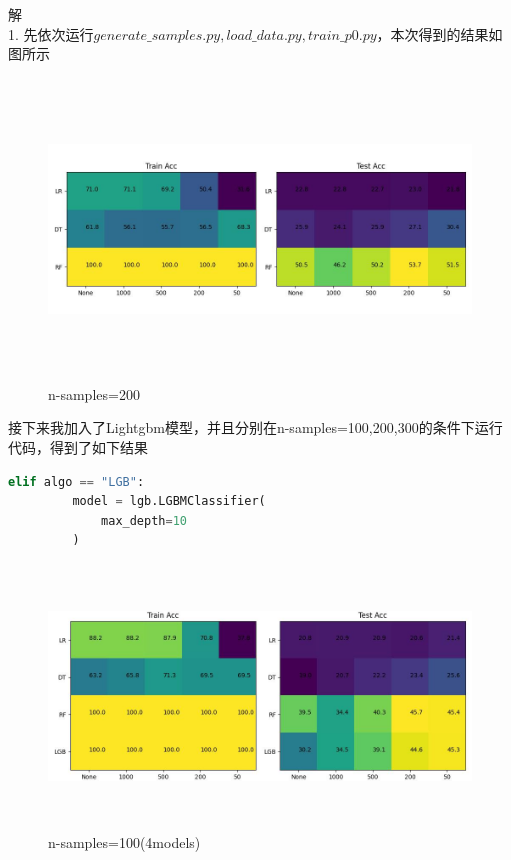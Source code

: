 \documentclass[answers]{exam}  %
\begin{document}
\begin{questions}
	
	解\\
	1. 先依次运行$generate\_samples.py,load\_data.py,train\_p0.py$，本次得到的结果如图所示
	\begin{figure}[h]
		\centering
		\includegraphics[width=15cm,height=8cm]{problem2-code/200-color.jpg}
		\caption{n-samples=200}
	\end{figure}

	接下来我加入了Lightgbm模型，并且分别在n-samples=100,200,300的条件下运行代码，得到了如下结果
\begin{lstlisting}[language={Python}]
     elif algo == "LGB":
         model = lgb.LGBMClassifier(
             max_depth=10
         )
\end{lstlisting}

	\newpage
	\begin{figure}[h]
		\centering
		\includegraphics[width=15cm,height=7cm]{problem2-code/100-color(4models).jpg}
		\caption{n-samples=100(4models)}
	\end{figure}


\end{questions}
\end{document}
